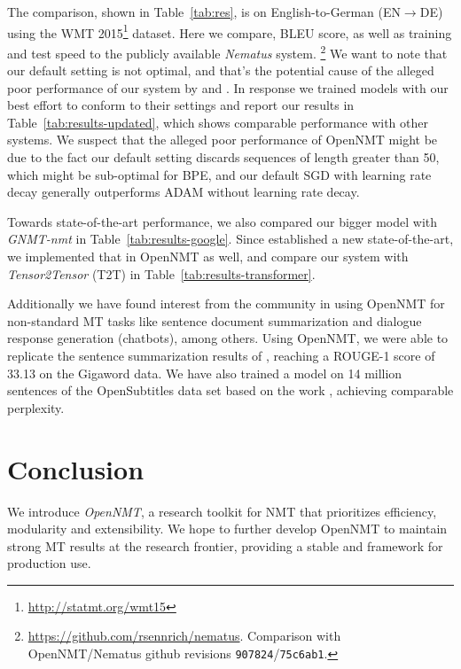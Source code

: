 \documentclass[]{article}
\begin{document}
The comparison, shown in Table~\ref{tab:res}, is on English-to-German
(EN$\rightarrow$DE) using the WMT
2015\footnote{\url{http://statmt.org/wmt15}} dataset. Here we compare,
BLEU score, as well as training and test speed to the publicly
available \textit{Nematus} system.
\footnote{\url{https://github.com/rsennrich/nematus}. Comparison with
  OpenNMT/Nematus github revisions {\tt 907824}/{\tt 75c6ab1}.} We want to note that our default setting is not optimal, and that's the potential cause of the alleged poor performance of our system by \cite{britz2017massive} and \cite{hieber2017sockeye}. In response we trained models with our best effort to conform to their settings and report our results in Table~\ref{tab:results-updated}, which shows comparable performance with other systems. We suspect that the alleged poor performance of OpenNMT might be due to the fact our default setting discards sequences of length greater than 50, which might be sub-optimal for BPE, and our default SGD with learning rate decay generally outperforms ADAM without learning rate decay. 

Towards state-of-the-art performance, we also compared our bigger model with \textit{GNMT-nmt} \citep{wu2016google} in Table~\ref{tab:results-google}. Since \cite{vaswani2017attention} established a new state-of-the-art, we implemented that in OpenNMT as well, and compare our system with \textit{Tensor2Tensor} (T2T) in Table~\ref{tab:results-transformer}.

Additionally we have found interest from the community in using
OpenNMT for non-standard MT tasks like sentence document summarization and
dialogue response generation (chatbots), among others.  Using
OpenNMT, we were able to replicate the sentence summarization results
of \citet{chopra2016abstractive}, reaching a ROUGE-1 score of 33.13 on
the Gigaword data. We have also trained a model on 14 million
sentences of the OpenSubtitles data set based on the work
\citet{vinyals2015neural}, achieving comparable perplexity.



\section{Conclusion}

We introduce \textit{OpenNMT}, a research toolkit for NMT that
prioritizes efficiency, modularity and extensibility. We hope to further develop
OpenNMT to maintain strong MT results at the research frontier,
providing a stable and framework for production use.
\newpage
\small



\end{document}
